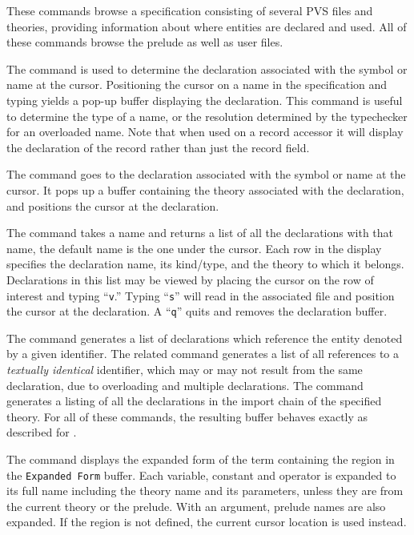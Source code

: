 These commands browse a specification consisting of several PVS files
and theories, providing information about where entities are declared
and used.  All of these commands browse the prelude as well as user
files.

The  command is used to determine the declaration
associated with the symbol or name at the cursor.  Positioning the cursor
on a name in the specification and typing  yields a pop-up
buffer displaying the declaration.  This command is useful to determine
the type of a name, or the resolution determined by the typechecker for an
overloaded name.  Note that when used on a record accessor it will
display the declaration of the record rather than just the record field.

The  command goes to the declaration associated with
the symbol or name at the cursor.  It pops up a buffer containing the
theory associated with the declaration, and positions the cursor at the
declaration.

The  command takes a name and returns a list of all
the declarations with that name, the default name is the one under the
cursor. Each row in the display specifies the declaration name, its
kind/type, and the theory to which it belongs.  Declarations in this list
may be viewed by placing the cursor on the row of interest and typing
``\texttt{v}.''  Typing ``\texttt{s}'' will read in the associated file
and position the cursor at the declaration.  A ``\texttt{q}'' quits and
removes the declaration buffer.

The  command generates a list of
declarations which reference the entity denoted by a given identifier.
The related  command generates a list of all
references to a \emph{textually identical} identifier, which may or may
not result from the same declaration, due to overloading and multiple
declarations.  The  command generates a listing of
all the declarations in the import chain of the specified theory.  For all
of these commands, the resulting buffer behaves exactly as described for
.

The  command displays the expanded form of the
term containing the region in the \texttt{Expanded Form} buffer.  Each
variable, constant and operator is expanded to its full name including the
theory name and its parameters, unless they are from the current theory or
the prelude.  With an argument, prelude names are also expanded.  If the
region is not defined, the current cursor location is used instead.

